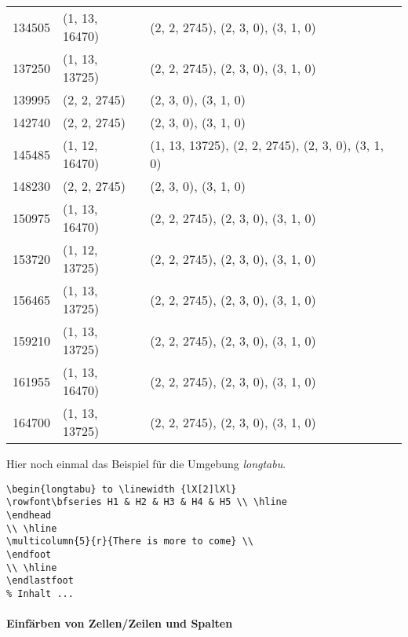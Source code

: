 \begin{center}
\begin{longtable}{|l|l|l|}
		134505 & (1, 13, 16470) & (2, 2, 2745), (2, 3, 0), (3, 1, 0) \\
		137250 & (1, 13, 13725) & (2, 2, 2745), (2, 3, 0), (3, 1, 0) \\
		139995 & (2, 2, 2745) & (2, 3, 0), (3, 1, 0) \\
		142740 & (2, 2, 2745) & (2, 3, 0), (3, 1, 0) \\
		145485 & (1, 12, 16470) & (1, 13, 13725), (2, 2, 2745), (2, 3, 0), (3, 1, 0) \\
		148230 & (2, 2, 2745) & (2, 3, 0), (3, 1, 0) \\
		150975 & (1, 13, 16470) & (2, 2, 2745), (2, 3, 0), (3, 1, 0) \\
		153720 & (1, 12, 13725) & (2, 2, 2745), (2, 3, 0), (3, 1, 0) \\
		156465 & (1, 13, 13725) & (2, 2, 2745), (2, 3, 0), (3, 1, 0) \\
		159210 & (1, 13, 13725) & (2, 2, 2745), (2, 3, 0), (3, 1, 0) \\
		161955 & (1, 13, 16470) & (2, 2, 2745), (2, 3, 0), (3, 1, 0) \\
		164700 & (1, 13, 13725) & (2, 2, 2745), (2, 3, 0), (3, 1, 0) \\
	\end{longtable}
\end{center}

Hier noch einmal das Beispiel für die Umgebung \emph{longtabu}.
\begin{lstlisting}[style=LaTeX]
\begin{longtabu} to \linewidth {lX[2]lXl}
\rowfont\bfseries H1 & H2 & H3 & H4 & H5 \\ \hline 
\endhead
\\ \hline
\multicolumn{5}{r}{There is more to come} \\
\endfoot
\\ \hline
\endlastfoot
% Inhalt ...
\end{lstlisting}


\paragraph{Einfärben von Zellen/Zeilen und Spalten}
	

